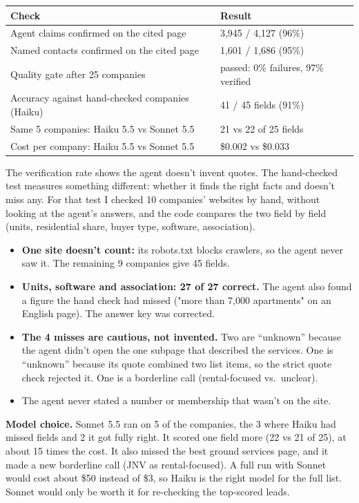 \documentclass[11pt,a4paper]{article}
\begin{document}
\begin{tabularx}{\linewidth}{@{}L l@{}}
\toprule
\textbf{Check} & \textbf{Result} \\
\midrule
Agent claims confirmed on the cited page & 3,945 / 4,127 (96\%) \\
Named contacts confirmed on the cited page & 1,601 / 1,686 (95\%) \\
Quality gate after 25 companies & passed: 0\% failures, 97\% verified \\
Accuracy against hand-checked companies (Haiku) & 41 / 45 fields (91\%) \\
Same 5 companies: Haiku 5.5 vs Sonnet 5.5 & 21 vs 22 of 25 fields \\
Cost per company: Haiku 5.5 vs Sonnet 5.5 & \$0.002 vs \$0.033 \\
\bottomrule
\end{tabularx}

The verification rate shows the agent doesn't invent quotes. The hand-checked test measures
something different: whether it finds the right facts and doesn't miss any. For that test I
checked 10 companies' websites by hand, without looking at the agent's answers, and the code
compares the two field by field (units, residential share, buyer type, software, association).

\begin{itemize}
  \item \textbf{One site doesn't count:} its robots.txt blocks crawlers, so the agent never saw
        it. The remaining 9 companies give 45 fields.
  \item \textbf{Units, software and association: 27 of 27 correct.} The agent also found a figure
        the hand check had missed ("more than 7,000 apartments" on an English page). The answer
        key was corrected.
  \item \textbf{The 4 misses are cautious, not invented.} Two are ``unknown'' because the agent
        didn't open the one subpage that described the services. One is ``unknown'' because its
        quote combined two list items, so the strict quote check rejected it. One is a borderline
        call (rental-focused vs.\ unclear).
  \item The agent never stated a number or membership that wasn't on the site.
\end{itemize}

\textbf{Model choice.} Sonnet 5.5 ran on 5 of the companies, the 3 where Haiku had missed
fields and 2 it got fully right. It scored one field more (22 vs 21 of 25), at about 15 times the
cost. It also missed the best ground services page, and it made a new borderline call
(JNV as rental-focused). A full run with Sonnet would cost about \$50 instead of \$3, so Haiku
is the right model for the full list. Sonnet would only be worth it for re-checking the
top-scored leads.
\end{document}
